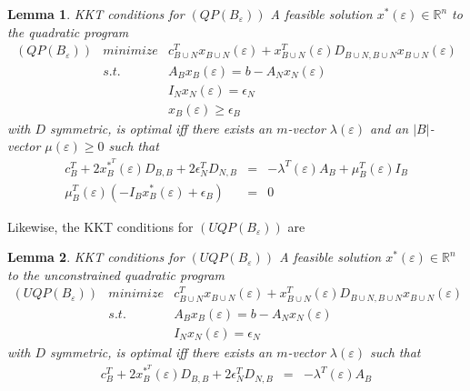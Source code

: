 \documentclass[a4paper]{article}
\newtheorem{lemma}{Lemma}
\begin{document}
\begin{lemma}{KKT conditions for $(QP(B_{\varepsilon}))$}
\label{lemma:KKT_QP(B)_epsilon}
A feasible solution $x^{*}(\varepsilon) \in \mathbb{R}^{n}$ to the quadratic
program
\begin{eqnarray*}
  \mbox{$(QP(B_{\varepsilon}))$} & minimize & c_{B \cup N}^{T}
    x_{B \cup N}(\varepsilon)
    + x_{B \cup N}^{T}(\varepsilon) 
    D_{B \cup N, B \cup N} x_{B \cup N}(\varepsilon) \\
    & s.t. & A_{B}x_{B}(\varepsilon) = b - A_{N}x_{N}(\varepsilon)  \\
    & & I_{N}x_{N}(\varepsilon) = \epsilon_{N}  \\
    & & x_{B}(\varepsilon) \geq \epsilon_{B}
\end{eqnarray*}
with $D$ symmetric, is optimal iff there exists an $m$-vector
$\lambda(\varepsilon)$ and an $\left|B\right|$-vector $\mu(\varepsilon) \geq 0$
such that
\begin{eqnarray}
  c_{B}^{T} + 2x_{B}^{*^{\scriptstyle{T}}}(\varepsilon)D_{B,B} +
  2\epsilon_{N}^{T}D_{N,B} & = &
  -\lambda^{T}(\varepsilon)A_{B} + \mu_{B}^{T}(\varepsilon)I_{B} \\
  \mu_{B}^{T}(\varepsilon) \left( -I_{B}x_{B}^{*}(\varepsilon) +
    \epsilon_{B} \right) & = & 0
\end{eqnarray}
\end{lemma}

Likewise, the KKT conditions for $(UQP(B_{\varepsilon}))$ are
\begin{lemma}{KKT conditions for $(UQP(B_{\varepsilon}))$}
\label{lemma:KKT_UQP(B)_epsilon}
A feasible solution $x^{*}(\varepsilon) \in \mathbb{R}^{n}$ to the
unconstrained quadratic program
\begin{eqnarray*}
  \mbox{$(UQP(B_{\varepsilon}))$} & minimize & c_{B \cup N}^{T}
    x_{B \cup N}(\varepsilon)
    + x_{B \cup N}^{T}(\varepsilon) D_{B \cup N, B \cup N}
    x_{B \cup N}(\varepsilon) \\
    & s.t. & A_{B}x_{B}(\varepsilon) = b - A_{N}x_{N}(\varepsilon)  \\
    & & I_{N}x_{N}(\varepsilon) = \epsilon_{N}  
\end{eqnarray*}
with $D$ symmetric, is optimal iff there exists an $m$-vector
$\lambda(\varepsilon)$ such that
\begin{eqnarray}
  c_{B}^{T} + 2x_{B}^{*^{\scriptstyle{T}}}(\varepsilon)D_{B,B} +
  2\epsilon_{N}^{T}D_{N,B} & = &
    -\lambda^{T}(\varepsilon)A_{B}
\end{eqnarray}
\end{lemma}
\end{document}

